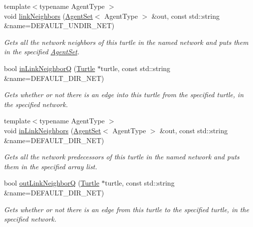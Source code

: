 \begin{DoxyCompactItemize}
{\footnotesize template$<$typename Agent\-Type $>$ }\\void \hyperlink{classrepast_1_1relogo_1_1_turtle_ad94359368b01be181ac5f70eb10cc31f}{link\-Neighbors} (\hyperlink{classrepast_1_1relogo_1_1_agent_set}{Agent\-Set}$<$ Agent\-Type $>$ \&out, const std\-::string \&name=D\-E\-F\-A\-U\-L\-T\-\_\-\-U\-N\-D\-I\-R\-\_\-\-N\-E\-T)
\begin{DoxyCompactList}\small\item\em Gets all the network neighbors of this turtle in the named network and puts them in the specified \hyperlink{classrepast_1_1relogo_1_1_agent_set}{Agent\-Set}. \end{DoxyCompactList}\item 
bool \hyperlink{classrepast_1_1relogo_1_1_turtle_a62c6d290ba854e36958c85de9c85914d}{in\-Link\-Neighbor\-Q} (\hyperlink{classrepast_1_1relogo_1_1_turtle}{Turtle} $\ast$turtle, const std\-::string \&name=D\-E\-F\-A\-U\-L\-T\-\_\-\-D\-I\-R\-\_\-\-N\-E\-T)
\begin{DoxyCompactList}\small\item\em Gets whether or not there is an edge into this turtle from the specified turtle, in the specified network. \end{DoxyCompactList}\item 
{\footnotesize template$<$typename Agent\-Type $>$ }\\void \hyperlink{classrepast_1_1relogo_1_1_turtle_ac17897ce742a5ef3ae07f0e8477b6943}{in\-Link\-Neighbors} (\hyperlink{classrepast_1_1relogo_1_1_agent_set}{Agent\-Set}$<$ Agent\-Type $>$ \&out, const std\-::string \&name=D\-E\-F\-A\-U\-L\-T\-\_\-\-D\-I\-R\-\_\-\-N\-E\-T)
\begin{DoxyCompactList}\small\item\em Gets all the network predecessors of this turtle in the named network and puts them in the specified array list. \end{DoxyCompactList}\item 
bool \hyperlink{classrepast_1_1relogo_1_1_turtle_ab9bd9b49c3130423aadd55d5cd671d86}{out\-Link\-Neighbor\-Q} (\hyperlink{classrepast_1_1relogo_1_1_turtle}{Turtle} $\ast$turtle, const std\-::string \&name=D\-E\-F\-A\-U\-L\-T\-\_\-\-D\-I\-R\-\_\-\-N\-E\-T)
\begin{DoxyCompactList}\small\item\em Gets whether or not there is an edge from this turtle to the specified turtle, in the specified network. \end{DoxyCompactList}\item 

\end{DoxyCompactItemize}
